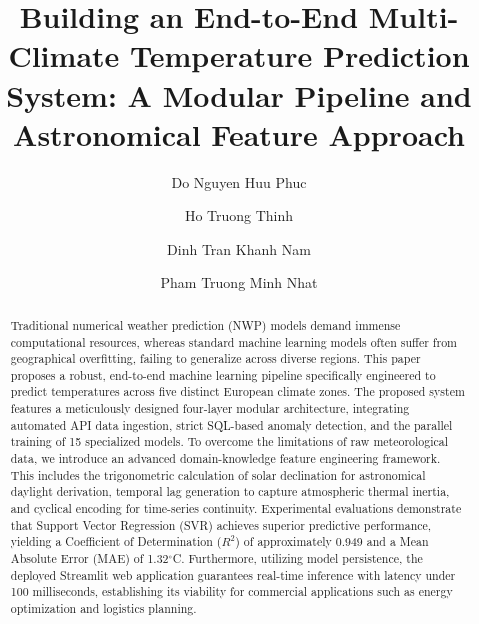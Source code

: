 \documentclass[runningheads]{llncs}
\begin{document}
\title{Building an End-to-End Multi-Climate Temperature Prediction System: A Modular Pipeline and Astronomical Feature Approach}

\author{Do Nguyen Huu Phuc \and
Ho Truong Thinh \and
Dinh Tran Khanh Nam \and
Pham Truong Minh Nhat}


\maketitle

\begin{abstract}
Traditional numerical weather prediction (NWP) models demand immense computational resources, whereas standard machine learning models often suffer from geographical overfitting, failing to generalize across diverse regions. This paper proposes a robust, end-to-end machine learning pipeline specifically engineered to predict temperatures across five distinct European climate zones. The proposed system features a meticulously designed four-layer modular architecture, integrating automated API data ingestion, strict SQL-based anomaly detection, and the parallel training of 15 specialized models. To overcome the limitations of raw meteorological data, we introduce an advanced domain-knowledge feature engineering framework. This includes the trigonometric calculation of solar declination for astronomical daylight derivation, temporal lag generation to capture atmospheric thermal inertia, and cyclical encoding for time-series continuity. Experimental evaluations demonstrate that Support Vector Regression (SVR) achieves superior predictive performance, yielding a Coefficient of Determination ($R^2$) of approximately 0.949 and a Mean Absolute Error (MAE) of 1.32$^\circ$C. Furthermore, utilizing model persistence, the deployed Streamlit web application guarantees real-time inference with latency under 100 milliseconds, establishing its viability for commercial applications such as energy optimization and logistics planning.

\end{abstract}
\end{document}
